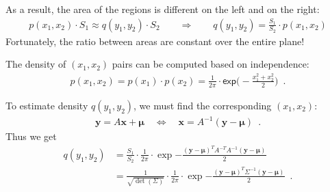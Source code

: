 \documentclass[landscape,footrule]{foils}
\renewcommand{\vec}[1]{\boldsymbol{#1}}
\newcommand{\lastline}{\vspace*{-2ex}}
\begin{document}
As a result, the area of the regions is different on the left and on the right:
\begin{align*}
p(x_1,x_2)\cdot S_1\approx q(y_1,y_2)\cdot S_2\qquad\Longrightarrow\qquad q(y_1,y_2)={\frac{S_1}{S_2}}\cdot p(x_1,x_2) 
\end{align*}
Fortunately, the ratio between areas are constant over the entire plane!\lastline

  

\enlargethispage{1cm}
The density of $(x_1,x_2)$ pairs can be computed based on independence:
\begin{align*}
p(x_1,x_2)=p(x_1)\cdot p(x_2)=\frac{1}{2\pi}\cdot\mathsf{exp}\Biggl(-\frac{x_1^2+x_2^2}{2}\Biggl)\enspace.
\end{align*}
\vspace*{-3ex}

To estimate density $q(y_1,y_2)$, we must find the corresponding $(x_1,x_2)$:
\begin{align*}
 \vec{y}=A\vec{x}+\vec{\mu}\quad\Leftrightarrow\quad \vec{x}=A^{-1}(\vec{y}-\vec{\mu})\enspace. 
\end{align*}
Thus we get \vspace*{-2ex}
\begin{align*}
q(y_1,y_2)&=\frac{S_1}{S_2}\cdot\frac{1}{2\pi}\cdot
\exp{-\frac{(\vec{y}-\vec{\mu})^T A^{-T}A^{-1}(\vec{y}-\vec{\mu})}{2}}\\
&=\frac{1}{\sqrt{\det(\Sigma)}}\cdot\frac{1}{2\pi}\cdot
\exp{-\frac{(\vec{y}-\vec{\mu})^T \Sigma^{-1}(\vec{y}-\vec{\mu})}{2}}\enspace.
\end{align*}

 

 
\end{document}
